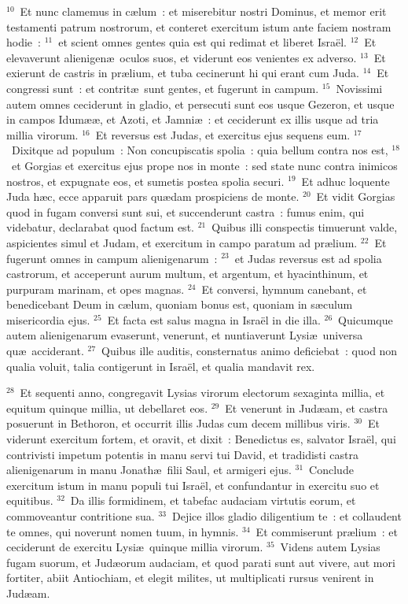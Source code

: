 ${}^{10}$~Et nunc clamemus in c\ae lum~: et miserebitur nostri Dominus, et memor erit testamenti patrum nostrorum, et conteret exercitum istum ante faciem nostram hodie~:
${}^{11}$~et scient omnes gentes quia est qui redimat et liberet Isra\"el.
${}^{12}$~Et elevaverunt alienigen\ae\ oculos suos, et viderunt eos venientes ex adverso.
${}^{13}$~Et exierunt de castris in pr\ae lium, et tuba cecinerunt hi qui erant cum Juda.
${}^{14}$~Et congressi sunt~: et contrit\ae\ sunt gentes, et fugerunt in campum.
${}^{15}$~Novissimi autem omnes ceciderunt in gladio, et persecuti sunt eos usque Gezeron, et usque in campos Idum\ae \ae , et Azoti, et Jamni\ae~: et ceciderunt ex illis usque ad tria millia virorum.
${}^{16}$~Et reversus est Judas, et exercitus ejus sequens eum.
${}^{17}$~Dixitque ad populum~: Non concupiscatis spolia~: quia bellum contra nos est,
${}^{18}$~et Gorgias et exercitus ejus prope nos in monte~: sed state nunc contra inimicos nostros, et expugnate eos, et sumetis postea spolia securi.
${}^{19}$~Et adhuc loquente Juda h\ae c, ecce apparuit pars qu\ae dam prospiciens de monte.
${}^{20}$~Et vidit Gorgias quod in fugam conversi sunt sui, et succenderunt castra~: fumus enim, qui videbatur, declarabat quod factum est.
${}^{21}$~Quibus illi conspectis timuerunt valde, aspicientes simul et Judam, et exercitum in campo paratum ad pr\ae lium.
${}^{22}$~Et fugerunt omnes in campum alienigenarum~:
${}^{23}$~et Judas reversus est ad spolia castrorum, et acceperunt aurum multum, et argentum, et hyacinthinum, et purpuram marinam, et opes magnas.
${}^{24}$~Et conversi, hymnum canebant, et benedicebant Deum in c\ae lum, quoniam bonus est, quoniam in s\ae culum misericordia ejus.
${}^{25}$~Et facta est salus magna in Isra\"el in die illa.
${}^{26}$~Quicumque autem alienigenarum evaserunt, venerunt, et nuntiaverunt Lysi\ae\ universa qu\ae\ acciderant.
${}^{27}$~Quibus ille auditis, consternatus animo deficiebat~: quod non qualia voluit, talia contigerunt in Isra\"el, et qualia mandavit rex.


${}^{28}$~Et sequenti anno, congregavit Lysias virorum electorum sexaginta millia, et equitum quinque millia, ut debellaret eos.
${}^{29}$~Et venerunt in Jud\ae am, et castra posuerunt in Bethoron, et occurrit illis Judas cum decem millibus viris.
${}^{30}$~Et viderunt exercitum fortem, et oravit, et dixit~: Benedictus es, salvator Isra\"el, qui contrivisti impetum potentis in manu servi tui David, et tradidisti castra alienigenarum in manu Jonath\ae\ filii Saul, et armigeri ejus.
${}^{31}$~Conclude exercitum istum in manu populi tui Isra\"el, et confundantur in exercitu suo et equitibus.
${}^{32}$~Da illis formidinem, et tabefac audaciam virtutis eorum, et commoveantur contritione sua.
${}^{33}$~Dejice illos gladio diligentium te~: et collaudent te omnes, qui noverunt nomen tuum, in hymnis.
${}^{34}$~Et commiserunt pr\ae lium~: et ceciderunt de exercitu Lysi\ae\ quinque millia virorum.
${}^{35}$~Videns autem Lysias fugam suorum, et Jud\ae orum audaciam, et quod parati sunt aut vivere, aut mori fortiter, abiit Antiochiam, et elegit milites, ut multiplicati rursus venirent in Jud\ae am.


